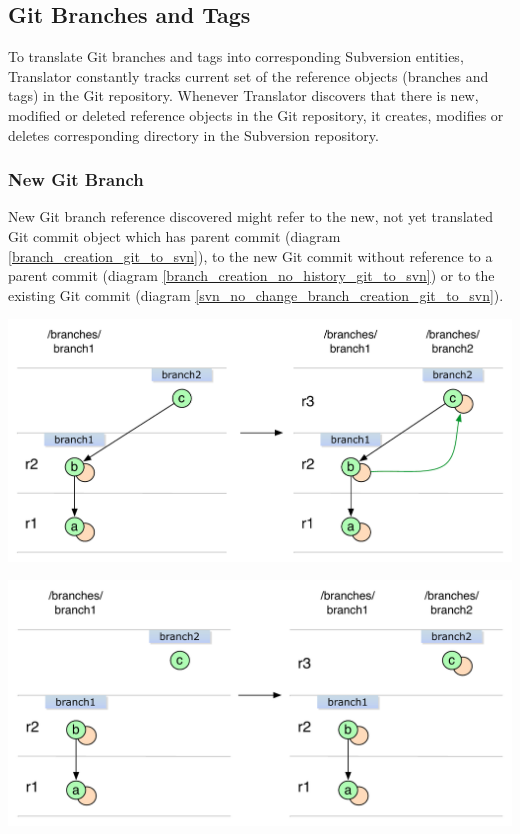 \subsection{Git Branches and Tags}

To translate Git branches and tags into corresponding Subversion entities, Translator
constantly tracks current set of the reference objects (branches and tags) in the Git repository. Whenever 
Translator discovers that there is new, modified or deleted reference objects in the Git 
repository, it creates, modifies or deletes corresponding directory in the Subversion repository.
\subsubsection{New Git Branch}

New Git branch reference discovered might refer to the new, not yet translated Git commit object
which has parent commit (diagram \ref{branch_creation_git_to_svn}), to the new Git commit without
reference to a parent commit (diagram \ref{branch_creation_no_history_git_to_svn}) or to the 
existing Git commit (diagram \ref{svn_no_change_branch_creation_git_to_svn}).

\begin{center}
\includegraphics[width=\textwidth]{img/diagrams/branch_creation_git_to_svn.pdf}%
\label{branch_creation_git_to_svn}%
\end{center}

\begin{center}
\includegraphics[width=\textwidth]{img/diagrams/branch_creation_no_history_git_to_svn.pdf}%
\label{branch_creation_no_history_git_to_svn}%
\end{center}

